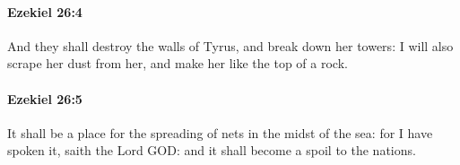 		\paragraph{Ezekiel 26:4} %
			\label{EZEKIEL-26-4}

			And they shall destroy the walls of Tyrus, and break down her towers: I will also scrape her dust from her, and make her like the top of a rock.


		\paragraph{Ezekiel 26:5} %
			\label{EZEKIEL-26-5}

			It shall be a place for the spreading of nets in the midst of the sea: for I have spoken it, saith the Lord GOD: and it shall become a spoil to the nations.


